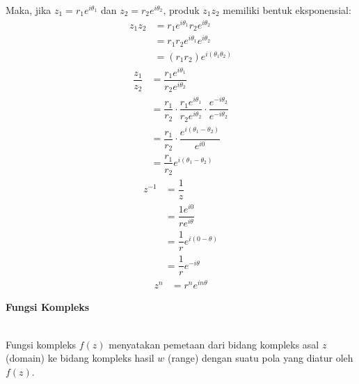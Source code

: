 \documentclass{article}
\begin{document}
Maka, jika $z_1 = r_1e^{i\theta_1}$ dan $z_2 = r_2e^{i\theta_2}$, produk $z_1z_2$ memiliki bentuk eksponensial:
\begin{align}
    z_1z_2 & = r_1e^{i\theta_1} r_2e^{i\theta_2}
    \nonumber                                    \\
           & = r_1r_2e^{i\theta_1}e^{i\theta_2}
    \nonumber                                    \\
           & = (r_1r_2)e^{i(\theta_1\theta_2)}
    \nonumber
\end{align}
\begin{align}
    \dfrac{z_1}{z_2} & = \dfrac{r_1e^{i\theta_1}}{r_2e^{i\theta_2}}
    \nonumber                                                                                                                           \\
                     & = \dfrac{r_1}{r_2} \cdot \dfrac{r_1e^{i\theta_1}}{r_2e^{i\theta_2}} \cdot \dfrac{e^{-i\theta_2}}{e^{-i\theta_2}}
    \nonumber                                                                                                                           \\
                     & = \dfrac{r_1}{r_2} \cdot \dfrac{e^{i(\theta_1-\theta_2)}}{e^{i0}}
    \nonumber                                                                                                                           \\
                     & = \dfrac{r_1}{r_2} e^{i(\theta_1-\theta_2)}
    \nonumber
\end{align}
\begin{align}
    z^{-1} & = \dfrac{1}{z}
    \nonumber                                \\
           & = \dfrac{1e^{i0}}{re^{i\theta}}
    \nonumber                                \\
           & = \dfrac{1}{r} e^{i(0-\theta)}
    \nonumber                                \\
           & = \dfrac{1}{r} e^{-i\theta}
    \nonumber
\end{align}
\begin{align}
    z^n & = r^n e^{in\theta}
    \nonumber
\end{align}



\newpage
\begin{center}
    \textbf{Fungsi Kompleks}
\end{center}
\leavevmode\\

Fungsi kompleks $f(z)$ menyatakan pemetaan dari bidang kompleks asal $z$ (domain) ke bidang kompleks hasil $w$ (range) dengan suatu pola yang diatur oleh $f(z)$.
\\
\end{document}
